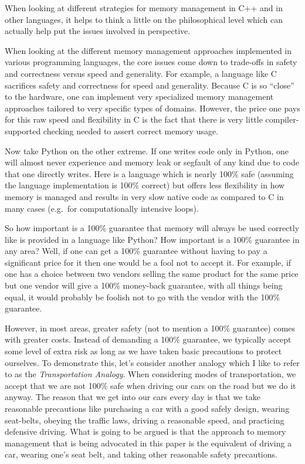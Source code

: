 \documentclass[pdf,ps2pdf,11pt]{SANDreport}
\begin{document}
When looking at different strategies for memory management in C++ and
in other languages, it helps to think a little on the philosophical
level which can actually help put the issues involved in perspective.

When looking at the different memory management approaches implemented
in various programming languages, the core issues come down to
trade-offs in safety and correctness versus speed and generality.  For
example, a language like C sacrifices safety and correctness for speed
and generality.  Because C is so ``close'' to the hardware, one can
implement very specialized memory management approaches tailored to
very specific types of domains.  However, the price one pays for this
raw speed and flexibility in C is the fact that there is very little
compiler-supported checking needed to assert correct memory usage.

Now take Python on the other extreme.  If one writes code only in
Python, one will almost never experience and memory leak or segfault
of any kind due to code that one directly writes.  Here is a language
which is nearly 100\% safe (assuming the language implementation is
100\% correct) but offers less flexibility in how memory is managed
and results in very slow native code as compared to C in many cases
(e.g.\ for computationally intensive loops).

So how important is a 100\% guarantee that memory will always be used
correctly like is provided in a language like Python?  How important
is a 100\% guarantee in any area?  Well, if one can get a 100\%
guarantee without having to pay a significant price for it then one
would be a fool not to accept it.  For example, if one has a choice
between two vendors selling the same product for the same price but
one vendor will give a 100\% money-back guarantee, with all things
being equal, it would probably be foolish not to go with the vendor
with the 100\% guarantee.

However, in most areas, greater safety (not to mention a 100\%
guarantee) comes with greater costs.  Instead of demanding a 100\%
guarantee, we typically accept some level of extra risk as long as we
have taken basic precautions to protect ourselves.  To demonstrate
this, let's consider another analogy which I like to refer to as the
{}\textit{Transportation Analogy}.  When considering modes of
transportation, we accept that we are not 100\% safe when driving our
cars on the road but we do it anyway.  The reason that we get into our
cars every day is that we take reasonable precautions like purchasing
a car with a good safely design, wearing seat-belts, obeying the
traffic laws, driving a reasonable speed, and practicing defensive
driving.  What is going to be argued is that the approach to memory
management that is being advocated in this paper is the equivalent of
driving a car, wearing one's seat belt, and taking other reasonable
safety precautions.
\end{document}
